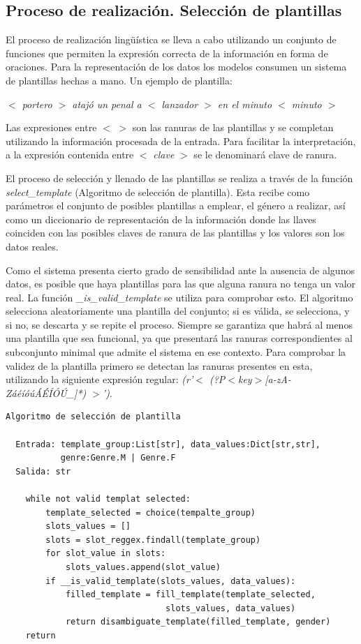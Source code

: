 \subsection{Proceso de realización. Selección de plantillas}

   El proceso de realización lingüística se lleva a cabo utilizando un conjunto de funciones que permiten la expresión correcta de la información 
en forma de oraciones. Para la representación de los datos los modelos consumen un sistema de plantillas hechas a mano. Un ejemplo de plantilla:

	\begin{center}
		\textit{$<$ portero $>$ atajó un penal a $<$ lanzador $>$ en el minuto $<$ minuto $>$}
	\end{center}

Las expresiones entre $<$ $>$ son las ranuras de las plantillas y se completan utilizando la información procesada de la entrada. Para facilitar la interpretación, 
a la expresión contenida entre $<$ \textit{clave} $>$ se le denominará clave de ranura.

  El proceso de selección y llenado de las plantillas se realiza a través de la función \emph{select\_template} (Algoritmo de selección de plantilla). 
  Esta recibe como parámetros el conjunto de posibles plantillas a emplear, el género a realizar, así como un diccionario de representación de la 
información donde las llaves coinciden con las posibles claves de ranura de las plantillas y los valores son los datos reales. 


  Como el sistema presenta cierto grado de sensibilidad ante la ausencia de algunos datos, es posible que haya plantillas para las que alguna ranura no tenga un 
valor real. La función \emph{\_is\_valid\_template} se utiliza para comprobar esto. El algoritmo selecciona aleatoriamente una plantilla del conjunto; si es válida, 
se selecciona, y si no, se descarta y se repite el proceso. Siempre se garantiza que habrá al menos una plantilla que sea funcional, ya que presentará las ranuras 
correspondientes al subconjunto minimal que admite el sistema en ese contexto. Para comprobar la validez de la plantilla primero 
se detectan las ranuras presentes en esta, utilizando la siguiente expresión regular: \textit{(r'$<$ (?P$<$key$>$[a-zA-ZáéíóúÁÉÍÓÚ\_]*) $>$')}.
  
\begin{verbatim}
Algoritmo de selección de plantilla
    
  Entrada: template_group:List[str], data_values:Dict[str,str], 
           genre:Genre.M | Genre.F
  Salida: str
    
    while not valid templat selected:
        template_selected = choice(tempalte_group)
        slots_values = []
        slots = slot_reggex.findall(template_group)
        for slot_value in slots:
            slots_values.append(slot_value)
        if __is_valid_template(slots_values, data_values):
            filled_template = fill_template(template_selected, 
                                slots_values, data_values)
            return disambiguate_template(filled_template, gender)
    return
    
\end{verbatim}   


